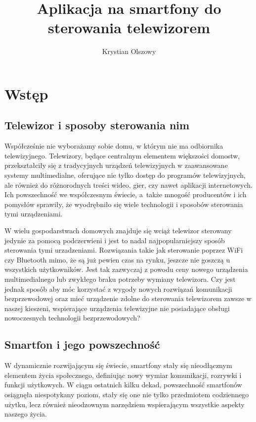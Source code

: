 \documentclass[12pt,twoside]{article}
\author{Krystian Olszowy}
\title{Aplikacja na smartfony do sterowania telewizorem}
\begin{document}
\maketitle

\blankpage

\tableofcontents

\clearpage
\blankpage

\section{Wstęp}
\subsection{Telewizor i sposoby sterowania nim}
Współcześnie nie wyborażamy sobie domu, w którym nie ma odbiornika telewizyjnego. Telewizory, będące
centralnym elementem większości domostw, przekształciły się z tradycyjnych urządzeń
telewizyjnych w zaawansowane systemy multimedialne, oferujące nie tylko dostęp do programów telewizyjnych,
ale również do różnorodnych treści wideo, gier, czy nawet aplikacji internetowych.
Ich powszechność we współczesnym świecie, a~także mnogość producentów i ich pomysłów
sprawiły, że wyodrębniło się wiele technologii i sposobów sterowania tymi urządzeniami.

W wielu gospodarstwach domowych znajduje się wciąż telewizor sterowany jedynie za pomocą podczerwieni i jest
to nadal najpopularniejszy sposób sterowania tymi urzadzeniami. Rozwiązania takie jak sterowanie poprzez WiFi czy Bluetooth
mimo, że są już pewien czas na rynku, jeszcze nie goszczą u wszystkich użytkowników. Jest tak zazwyczaj z powodu ceny
nowego urządzenia multimedialnego lub zwykłego braku potrzeby wymiany telewizora. Czy jest jednak sposób aby
móc korzystać z wygody nowych rozwiązań komunikacji bezprzewodowej oraz mieć urządzenie zdolne do sterowania
telewizorem zawsze w naszej kieszeni, wspierające urządzenia telewizyjne nie posiadające obsługi nowoczesnych technologii bezprzewodowych?

\subsection{Smartfon i jego powszechność}
W dynamicznie rozwijającym się świecie, smartfony stały się nieodłącznym elementem życia społecznego,
definiując nowy wymiar komunikacji, rozrywki i funkcji użytkowych.
W ciągu ostatnich kilku dekad, powszechność smartfonów osiągnęła niespotykany poziom,
stały się one nie tylko przedmiotem codziennego użytku, lecz również nieodzownym
narzędziem wspierającym wszystkie aspekty naszego życia.
\end{document}
